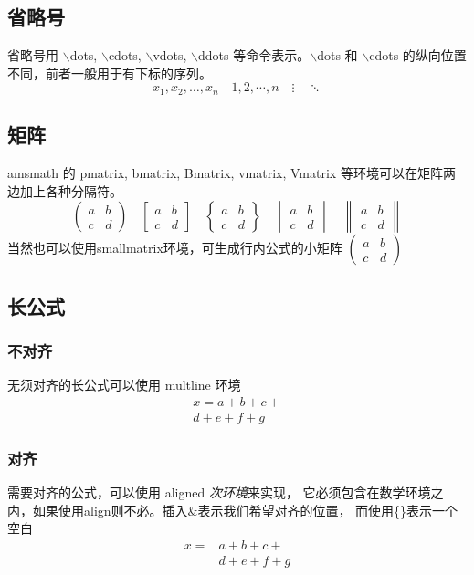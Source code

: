 \subsection{省略号}
省略号用 $\backslash$dots, $\backslash$cdots, $\backslash$vdots, $\backslash$ddots 
等命令表示。$\backslash$dots 和 $\backslash$cdots 的纵向位置不同，前者一般用于有下标的序列。
\[ x_1,x_2,\dots ,x_n\quad 1,2,\cdots ,n\quad
\vdots\quad \ddots \]
\subsection{矩阵}
amsmath 的 pmatrix, bmatrix, Bmatrix, vmatrix, Vmatrix 
等环境可以在矩阵两边加上各种分隔符。
\begin{equation*}
\begin{pmatrix} a&b\\c&d \end{pmatrix} \quad
\begin{bmatrix} a&b\\c&d \end{bmatrix} \quad
\begin{Bmatrix} a&b\\c&d \end{Bmatrix} \quad
\begin{vmatrix} a&b\\c&d \end{vmatrix} \quad
\begin{Vmatrix} a&b\\c&d \end{Vmatrix}
\end{equation*}
当然也可以使用smallmatrix环境，可生成行内公式的小矩阵
$ ( \begin{smallmatrix} a&b\\c&d \end{smallmatrix} ) $
\subsection{长公式}
\subsubsection{不对齐}
无须对齐的长公式可以使用 multline 环境
\begin{multline*}
    x = a+b+c+{} \\
    d+e+f+g
\end{multline*}
\subsubsection{对齐}
需要对齐的公式，可以使用 aligned \textit{次环境}来实现，
它必须包含在数学环境之内，如果使用align则不必。插入\&表示我们希望对齐的位置，
而使用\{\}表示一个空白
\begin{equation*} 
    \begin{aligned}
        x ={}&a+b+c+ \\
             &d+e+f+g
    \end{aligned}
\end{equation*}
